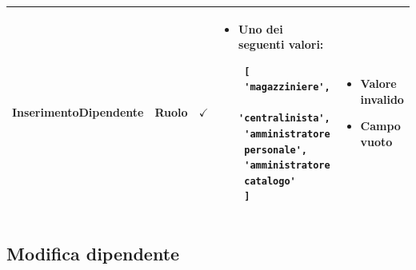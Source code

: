\documentclass[12pt]{article}
\begin{document}
\begin{longtable}{|l|l|l|l|l|}
 \textbf{InserimentoDipendente} & Ruolo & $\checkmark$ & \begin{minipage}{3.8cm}
 \vspace{5pt}
 \begin{itemize}
 \item Uno dei seguenti valori: \begin{verbatim}
 [ 
 'magazziniere',
 'centralinista',
 'amministratore
 personale',
 'amministratore
 catalogo' 
 ]
 \end{verbatim}
 \end{itemize}
 \vspace{5pt}
 \end{minipage} & \begin{minipage}{4cm}
 \vspace{5pt}
 \begin{itemize}
 \item Valore invalido
 \item Campo vuoto
 \end{itemize}
 \vspace{5pt}
 \end{minipage} \\ \hline
 \end{longtable}
 
 
 \newpage
 \subsection{Modifica dipendente}
 
\end{document}
